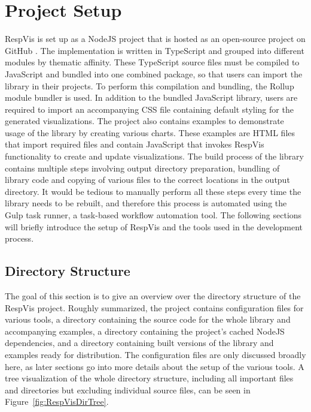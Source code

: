 

\section{Project Setup}
\label{sec:ProjectSetup}

RespVis is set up as a NodeJS \parencite{NodeJS} project that is hosted as an open-source project on GitHub \parencite{RespVisGitHub}.
The implementation is written in TypeScript and grouped into different modules by thematic affinity. 
These TypeScript source files must be compiled to JavaScript and bundled into one combined package, so that users can import the library in their projects.
To perform this compilation and bundling, the Rollup module bundler \parencite{Rollup} is used.
In addition to the bundled JavaScript library, users are required to import an accompanying CSS file containing default styling for the generated visualizations.
The project also contains examples to demonstrate usage of the library by creating various charts.
These examples are HTML files that import required files and contain JavaScript that invokes RespVis functionality to create and update visualizations.
The build process of the library contains multiple steps involving output directory preparation, bundling of library code and copying of various files to the correct locations in the output directory.
It would be tedious to manually perform all these steps every time the library needs to be rebuilt, and therefore this process is automated using the Gulp \parencite{Gulp} task runner, a task-based workflow automation tool.
The following sections will briefly introduce the setup of RespVis and the tools used in the development process.  

\subsection{Directory Structure}

The goal of this section is to give an overview over the directory structure of the RespVis project.
Roughly summarized, the project contains configuration files for various tools, a  directory containing the source code for the whole library and accompanying examples, a  directory containing the project's cached NodeJS dependencies, and a  directory containing built versions of the library and examples ready for distribution.
The configuration files are only discussed broadly here, as later sections go into more details about the setup of the various tools.
A tree visualization of the whole directory structure, including all important files and directories but excluding individual source files, can be seen in Figure~\ref{fig:RespVisDirTree}.

